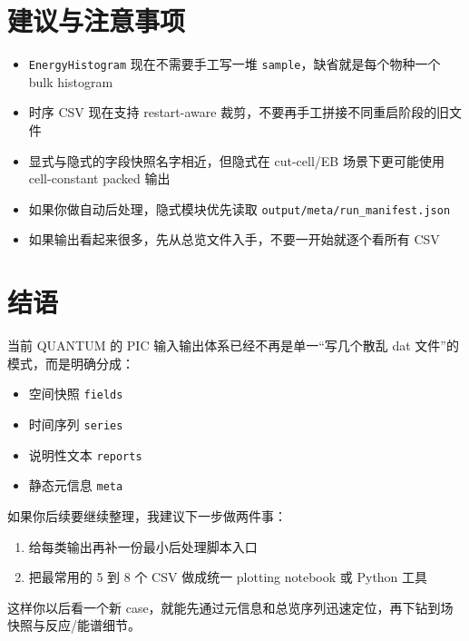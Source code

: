 \documentclass[11pt,a4paper]{ctexart}
\newcommand{\code}[1]{\texttt{#1}}
\newcommand{\file}[1]{\texttt{#1}}
\newcommand{\dir}[1]{\texttt{#1}}
\begin{document}
\section{建议与注意事项}

\begin{itemize}
  \item \code{EnergyHistogram} 现在不需要手工写一堆 \code{sample}，缺省就是每个物种一个 bulk histogram
  \item 时序 CSV 现在支持 restart-aware 裁剪，不要再手工拼接不同重启阶段的旧文件
  \item 显式与隐式的字段快照名字相近，但隐式在 cut-cell/EB 场景下更可能使用 cell-constant packed 输出
  \item 如果你做自动后处理，隐式模块优先读取 \file{output/meta/run\_manifest.json}
  \item 如果输出看起来很多，先从总览文件入手，不要一开始就逐个看所有 CSV
\end{itemize}

\section{结语}

当前 QUANTUM 的 PIC 输入输出体系已经不再是单一``写几个散乱 dat 文件''的模式，而是明确分成：

\begin{itemize}
  \item 空间快照 \dir{fields}
  \item 时间序列 \dir{series}
  \item 说明性文本 \dir{reports}
  \item 静态元信息 \dir{meta}
\end{itemize}

如果你后续要继续整理，我建议下一步做两件事：

\begin{enumerate}
  \item 给每类输出再补一份最小后处理脚本入口
  \item 把最常用的 5 到 8 个 CSV 做成统一 plotting notebook 或 Python 工具
\end{enumerate}

这样你以后看一个新 case，就能先通过元信息和总览序列迅速定位，再下钻到场快照与反应/能谱细节。
\end{document}
